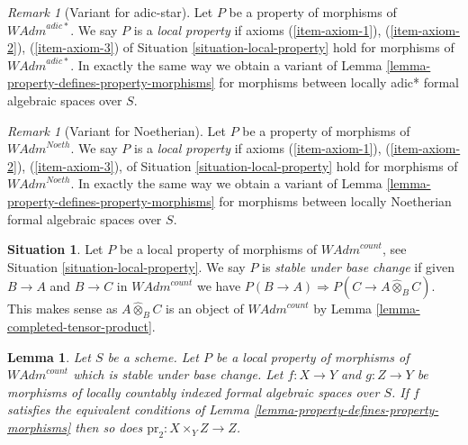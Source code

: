 \documentclass{stacks-project}
\theoremstyle{plain}
\newtheorem{lemma}[subsection]{Lemma}
\theoremstyle{definition}
\newtheorem{situation}[subsection]{Situation}
\theoremstyle{remark}
\newtheorem{remark}[subsection]{Remark}
\numberwithin{equation}{subsection}
\begin{document}
\begin{remark}[Variant for adic-star]
\label{remark-variant-adic-star}
Let $P$ be a property of morphisms of $\textit{WAdm}^{adic*}$.
We say $P$ is a {\it local property} if axioms
(\ref{item-axiom-1}), (\ref{item-axiom-2}), (\ref{item-axiom-3})
of Situation \ref{situation-local-property}
hold for morphisms of $\textit{WAdm}^{adic*}$. In exactly the same way
we obtain a variant of Lemma \ref{lemma-property-defines-property-morphisms}
for morphisms between locally adic* formal algebraic spaces over $S$.
\end{remark}

\begin{remark}[Variant for Noetherian]
\label{remark-variant-Noetherian}
Let $P$ be a property of morphisms of $\textit{WAdm}^{Noeth}$.
We say $P$ is a {\it local property} if axioms
(\ref{item-axiom-1}), (\ref{item-axiom-2}), (\ref{item-axiom-3}),
of Situation \ref{situation-local-property}
hold for morphisms of $\textit{WAdm}^{Noeth}$. In exactly the same way
we obtain a variant of Lemma \ref{lemma-property-defines-property-morphisms}
for morphisms between locally Noetherian formal algebraic spaces over $S$.
\end{remark}

\begin{situation}
\label{situation-base-change-local-property}
Let $P$ be a local property of morphisms of $\textit{WAdm}^{count}$, see
Situation \ref{situation-local-property}. We say $P$ is {\it stable under
base change} if given $B \to A$ and $B \to C$ in $\textit{WAdm}^{count}$
we have $P(B \to A) \Rightarrow P(C \to A \widehat{\otimes}_B C)$.
This makes sense as $A \widehat{\otimes}_B C$ is an object of
$\textit{WAdm}^{count}$ by Lemma \ref{lemma-completed-tensor-product}.
\end{situation}

\begin{lemma}
\label{lemma-base-change-property-morphisms}
Let $S$ be a scheme. Let $P$ be a local property of morphisms of
$\textit{WAdm}^{count}$ which is stable under base change.
Let $f : X \to Y$ and $g : Z \to Y$ be morphisms of locally countably indexed
formal algebraic spaces over $S$. If $f$ satisfies the equivalent conditions of
Lemma \ref{lemma-property-defines-property-morphisms}
then so does $\text{pr}_2 : X \times_Y Z \to Z$.
\end{lemma}
\end{document}
